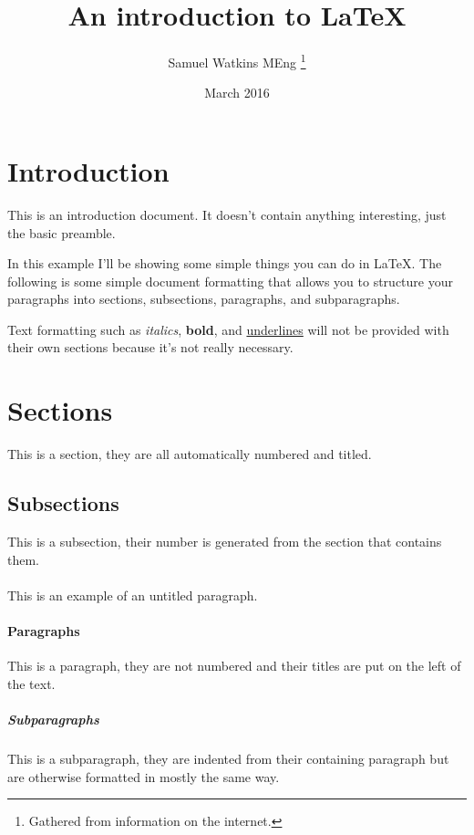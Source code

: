 \documentclass[12pt, letterpaper]{article}
\title{An introduction to \LaTeX}
\author{Samuel Watkins MEng \thanks{Gathered from information on the internet.}}
\date{March 2016}
\begin{document}
\begin{titlepage}
\maketitle
\end{titlepage}

\tableofcontents
\newpage


\section{Introduction}
This is an introduction document. It doesn't contain anything interesting, just
the basic preamble.\cite{preamble}

In this example I'll be showing some simple things you can do in \LaTeX. The
following is some simple document formatting that allows you to structure your
paragraphs into sections, subsections, paragraphs, and subparagraphs.

Text formatting such as \textit{italics}, \textbf{bold}, and \underline{underlines} will not be provided with their own sections because it's not really necessary.\cite{formatting}

\section{Sections}
This is a section, they are all automatically numbered and titled.\cite{paragraphs}

\subsection{Subsections}
This is a subsection, their number is generated from the section that contains them.

\paragraph{}
This is an example of an untitled paragraph.

\paragraph{Paragraphs}
This is a paragraph, they are not numbered and their titles are put on the left of the text.

\subparagraph{Subparagraphs}
This is a subparagraph, they are indented from
their containing paragraph but are otherwise formatted in mostly the same way.
\end{document}
